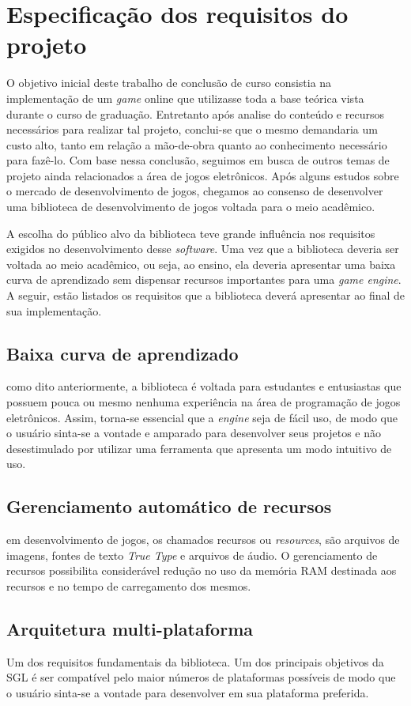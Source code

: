 \section{Especificação dos requisitos do projeto}
%
O objetivo inicial deste trabalho de conclusão de curso consistia na implementação de um \textit{game} online que utilizasse toda a base teórica vista durante o curso de graduação. Entretanto após analise do conteúdo e recursos necessários para realizar tal projeto, conclui-se que o mesmo demandaria um custo alto, tanto em relação a mão-de-obra quanto ao conhecimento necessário para fazê-lo. Com base nessa conclusão, seguimos em busca de outros temas de projeto ainda relacionados a área de jogos eletrônicos. Após alguns estudos sobre o mercado de desenvolvimento de jogos, chegamos ao consenso de desenvolver uma biblioteca de desenvolvimento de jogos voltada para o meio acadêmico.
\par 
A escolha do público alvo da biblioteca teve grande influência nos requisitos exigidos no desenvolvimento desse \textit{software}. Uma vez que
a biblioteca deveria ser voltada ao meio acadêmico, ou seja, ao ensino, ela deveria apresentar uma baixa curva de aprendizado sem dispensar recursos importantes para uma \textit{game engine}. A seguir, estão listados os requisitos que a biblioteca deverá apresentar ao final de sua implementação.
%
\subsection{Baixa curva de aprendizado}
%
como dito anteriormente, a biblioteca é voltada para estudantes e entusiastas que possuem pouca ou mesmo nenhuma experiência na área de programação de jogos eletrônicos. Assim, torna-se essencial que a \textit{engine} seja de fácil uso, de modo que o usuário sinta-se a vontade e amparado para desenvolver seus projetos e não desestimulado por utilizar uma ferramenta que apresenta um modo intuitivo de uso.
%
\subsection{Gerenciamento automático de recursos}
%
em desenvolvimento de jogos, os chamados recursos ou \textit{resources}, são arquivos de imagens, fontes de texto \textit{True Type} e arquivos de áudio. O gerenciamento de recursos possibilita considerável redução no uso da memória RAM destinada aos recursos e no tempo de carregamento dos mesmos.
%
\subsection{Arquitetura multi-plataforma}
%
Um dos requisitos fundamentais da biblioteca. Um dos principais objetivos da SGL é ser compatível pelo maior números de plataformas possíveis de modo que o usuário sinta-se a vontade para desenvolver em sua plataforma preferida.
%
